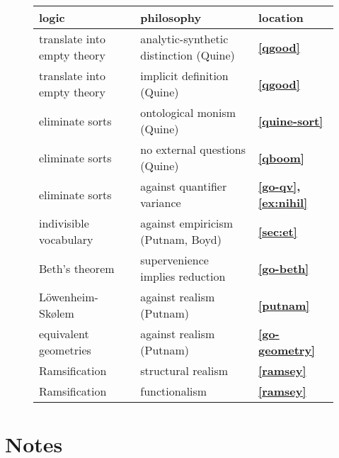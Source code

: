 \begin{figure}[H]
\begin{tabular}{l | l | l}
  logic & philosophy & location \\
  \hline \hline
  translate into empty theory & analytic-synthetic distinction (Quine)
                     & \textbf{\ref{qgood}}  \\
  \hline
  translate into empty theory & implicit definition (Quine) &
                                                              \textbf{\ref{qgood}} \\
  \hline   
  eliminate sorts & ontological monism (Quine)  & \textbf{\ref{quine-sort}} \\
  \hline
  eliminate sorts & no external questions (Quine) & \textbf{\ref{qboom}} \\
  \hline        
  eliminate sorts & against quantifier variance & \textbf{\ref{go-qv}, \ref{ex:nihil}} \\
  \hline  indivisible vocabulary   & against empiricism (Putnam, Boyd)
                     & \textbf{\ref{sec:et}} \\
  \hline 
  Beth's theorem & supervenience implies reduction & \textbf{\ref{go-beth}} \\          
  \hline L{\"o}wenheim-Sk{\o}lem & against realism (Putnam) & \textbf{\ref{putnam}} \\
  \hline
  equivalent geometries  & against realism (Putnam) & \textbf{\ref{go-geometry}} \\
  \hline Ramsification & structural realism & \textbf{\ref{ramsey}} \\
  \hline Ramsification & functionalism & \textbf{\ref{ramsey}} \\ 
  \hline
\end{tabular}
\end{figure}







\section*{Notes}

